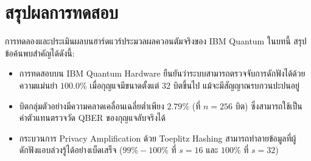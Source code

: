 \section{สรุปผลการทดสอบ}

การทดลองและประเมินผลบนฮาร์ดแวร์ประมวลผลควอนตัมจริงของ IBM Quantum ในบทนี้ สรุปข้อค้นพบสำคัญได้ดังนี้:
\begin{itemize}
    \item การทดสอบบน IBM Quantum Hardware ยืนยันว่าระบบสามารถตรวจจับการดักฟังได้ด้วยความแม่นยำ $100.0\%$ เมื่อกุญแจมีขนาดตั้งแต่ $32$ บิตขึ้นไป แม้จะมีสัญญาณรบกวนปะปนอยู่
    \item บิตกลุ่มตัวอย่างมีความคลาดเคลื่อนเฉลี่ยต่ำเพียง $2.79\%$ (ที่ $n = 256$ บิต) ซึ่งสามารถใช้เป็นค่าตัวแทนตรวจวัด QBER ของกุญแจลับจริงได้
    \item กระบวนการ Privacy Amplification ด้วย Toeplitz Hashing สามารถทำลายข้อมูลที่ผู้ดักฟังแอบล่วงรู้ได้อย่างเบ็ดเสร็จ ($99\% - 100\%$ ที่ $s = 16$ และ $100\%$ ที่ $s = 32$)
\end{itemize}
